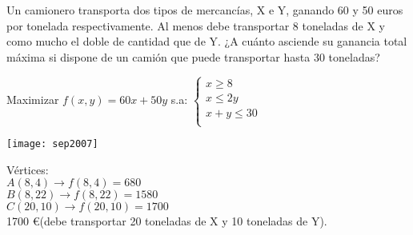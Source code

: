\documentclass[addpoints,spanish, 12pt,a4paper]{exam}
\begin{document}
\begin{questions}
\addpoints






\question[2] Un camionero transporta dos tipos de mercancías, X e Y, ganando 60 y 50 euros por
tonelada respectivamente. Al menos debe transportar 8 toneladas de X y como mucho el doble de cantidad
que de Y. ¿A cuánto asciende su ganancia total máxima si dispone de un camión que puede transportar
hasta 30 toneladas? 


  
\begin{solution}
Maximizar $f(x,y)=60x+50y$ s.a: $\left\{ \begin{matrix}
x \geqslant 8 \\
x \leqslant 2y \\
x+y \leqslant 30 \\
 \end{matrix} \right.$ 
 
\texttt{[image: sep2007]}


Vértices:\\
$A(8 , 4) \to f(8,4)=680$\\
$B(8 , 22) \to f(8,22)=1580$\\
$C(20 , 10) \to f(20,10)=1700$\\

1700 \euro (debe transportar 20 toneladas de X y 10 toneladas de Y). \end{solution}




\addpoints



\end{questions}
\end{document}
